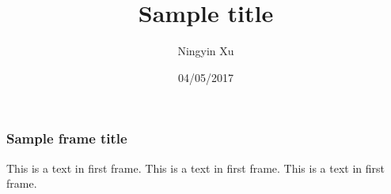 \documentclass{beamer}
\title{Sample title}
\author{Ningyin Xu}
\institute{MACSS}
\date{04/05/2017}
\begin{document}
 
\frame{\titlepage}
 
\begin{frame}
\frametitle{Sample frame title}
This is a text in first frame. This is a text in first frame. This is a text in first frame.
\end{frame}
 
\end{document}
